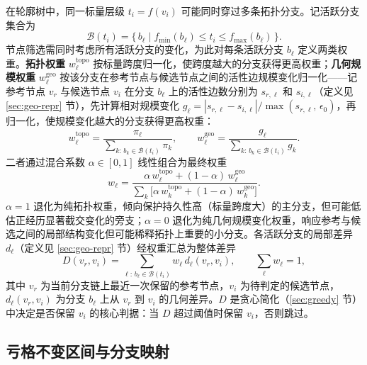 \documentclass[twocolumn, a4paper, 10pt]{article}
\begin{document}
在轮廓树中，同一标量层级 $t_i = f(v_i)$ 可能同时穿过多条拓扑分支。记活跃分支集合为
\begin{equation}
\mathcal{B}(t_i) = \{\,b_\ell \mid f_{\min}(b_\ell) \leq t_i \leq f_{\max}(b_\ell)\,\}.
\label{eq:active-branch}
\end{equation}
节点筛选需同时考虑所有活跃分支的变化，为此对每条活跃分支 $b_\ell$ 定义两类权重。\textbf{拓扑权重} $w^{\mathrm{topo}}_\ell$ 按标量跨度归一化，使跨度越大的分支获得更高权重；\textbf{几何规模权重} $w^{\mathrm{geo}}_\ell$ 按该分支在参考节点与候选节点之间的活性边规模变化归一化——记参考节点 $v_r$ 与候选节点 $v_i$ 在分支 $b_\ell$ 上的活性边数分别为 $s_{r,\ell}$ 和 $s_{i,\ell}$（定义见 \ref{sec:geo-repr} 节），先计算相对规模变化 $g_\ell = |s_{r,\ell} - s_{i,\ell}|/\max(s_{r,\ell},\,\epsilon_0)$，再归一化，使规模变化越大的分支获得更高权重：
\begin{equation}
w^{\mathrm{topo}}_\ell = \frac{\pi_\ell}{\sum_{k:\,b_k \in \mathcal{B}(t_i)} \pi_k},\qquad
w^{\mathrm{geo}}_\ell = \frac{g_\ell}{\sum_{k:\,b_k \in \mathcal{B}(t_i)} g_k}.
\label{eq:weights}
\end{equation}
二者通过混合系数 $\alpha \in [0,1]$ 线性组合为最终权重
\begin{equation}
w_\ell = \frac{\alpha\,w^{\mathrm{topo}}_\ell + (1-\alpha)\,w^{\mathrm{geo}}_\ell}
{\sum_{k}\bigl[\alpha\,w^{\mathrm{topo}}_k + (1-\alpha)\,w^{\mathrm{geo}}_k\bigr]}.
\label{eq:wmix}
\end{equation}
$\alpha = 1$ 退化为纯拓扑权重，倾向保护持久性高（标量跨度大）的主分支，但可能低估正经历显著截交变化的旁支；$\alpha = 0$ 退化为纯几何规模变化权重，响应参考与候选之间的局部结构变化但可能稀释拓扑上重要的小分支。各活跃分支的局部差异 $d_\ell$（定义见 \ref{sec:geo-repr} 节）经权重汇总为整体差异
\begin{equation}
D(v_r, v_i) = \sum_{\ell:\,b_\ell \in \mathcal{B}(t_i)} w_\ell\, d_\ell(v_r, v_i),\qquad \sum_\ell w_\ell = 1,
\label{eq:aggregate}
\end{equation}
其中 $v_r$ 为当前分支链上最近一次保留的参考节点，$v_i$ 为待判定的候选节点，$d_\ell(v_r, v_i)$ 为分支 $b_\ell$ 上从 $v_r$ 到 $v_i$ 的几何差异。$D$ 是贪心简化（\ref{sec:greedy} 节）中决定是否保留 $v_i$ 的核心判据：当 $D$ 超过阈值时保留 $v_i$，否则跳过。

\subsection{亏格不变区间与分支映射}
\label{sec:genus-interval}
\end{document}
